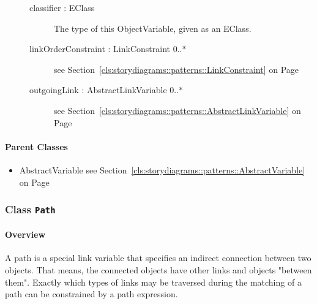 \begin{description}
\begin{description}
	
\item[classifier : EClass 	]

\hspace{\fill}
\nopagebreak


	
			
The type of this ObjectVariable, given as an EClass.	
			
	
		
	
\item[linkOrderConstraint : LinkConstraint 			\symbol{"5B}0..$*$\symbol{"5D}]
see Section~\ref{cls:storydiagrams::patterns::LinkConstraint} on Page~\pageref{cls:storydiagrams::patterns::LinkConstraint}
\hspace{\fill}
\nopagebreak


	
\item[outgoingLink : AbstractLinkVariable 			\symbol{"5B}0..$*$\symbol{"5D}]
see Section~\ref{cls:storydiagrams::patterns::AbstractLinkVariable} on Page~\pageref{cls:storydiagrams::patterns::AbstractLinkVariable}
\hspace{\fill}
\nopagebreak


	
	\end{description}
	

\end{description}

\paragraph{Parent Classes}
\begin{itemize}
\item AbstractVariable see Section~\ref{cls:storydiagrams::patterns::AbstractVariable} on Page~\pageref{cls:storydiagrams::patterns::AbstractVariable}\end{itemize}
\subsubsection{\Large{Class \bfseries \texttt{Path}\normalfont}}
\label{cls:storydiagrams::patterns::Path} 
\paragraph{Overview}

	
			
A path is a special link variable that specifies an indirect connection between two objects. That means, the connected objects have other links and objects "between them". Exactly which types of links may be traversed during the matching of a path can be constrained by a path expression.	
		
